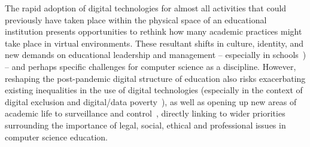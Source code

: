 \documentclass[conference]{IEEEtran}
\begin{document}

The rapid adoption of digital technologies for almost all activities
that could previously have taken place within the physical space of an
educational institution presents opportunities to rethink how many
academic practices might take place in virtual environments. These
resultant shifts in culture, identity, and new demands on educational
leadership and management -- especially in
schools~\cite{slameditorial:2020}) -- and perhaps specific challenges
for computer science as a discipline. However, reshaping the
post-pandemic digital structure of education also risks exacerbating
existing inequalities in the use of digital technologies (especially
in the context of digital exclusion and digital/data
poverty~\cite{watts:2020,beaunoyer-et-al:2020}), as well as opening up
new areas of academic life to surveillance and
control~\cite{carriganlseblog:2020}, directly linking to wider
priorities surrounding the importance of legal, social, ethical and
professional issues in computer science education.
\end{document}
